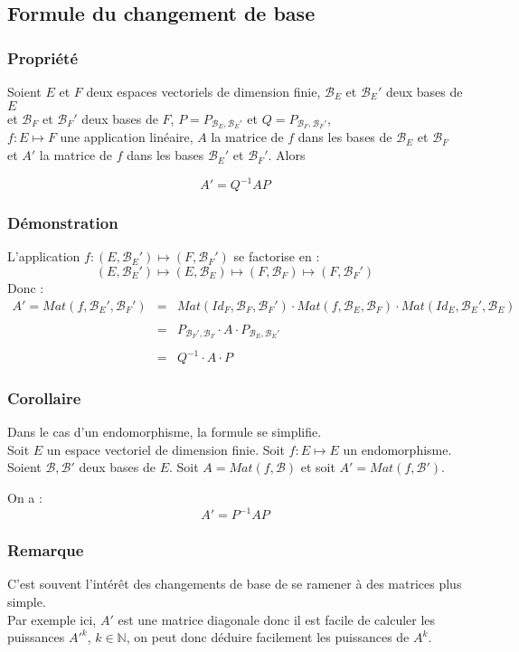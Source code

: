 \documentclass[a4paper,10pt]{book} %
\newcommand{\N}{\mathbb{N}}
\newcommand{\B}{\mathcal{B}}
\begin{document}
\subsection{Formule du changement de base}
\subsubsection{Propriété}
Soient $E$ et $F$ deux espaces vectoriels de dimension finie, $\B_E$ et $\B_E'$ deux bases de $E$\\
et $\B_F$ et $\B_F'$ deux bases de $F$, $P=P_{\B_E,\B_E'}$ et $Q=P_{\B_F,\B_F'}$,\\
$f:E\mapsto F$ une application linéaire, $A$ la matrice de $f$ dans les bases de $\B_E$ et $\B_F$\\
et $A'$ la matrice de $f$ dans les bases $\B_E'$ et $\B_F'$. Alors 

$$A'=Q^{-1}AP$$

\subsubsection{Démonstration}
L'application $f:(E,\B_E')\mapsto (F,\B_F')$ se factorise en :
$$(E,\B_E')\mapsto (E,\B_E)\mapsto (F,\B_F)\mapsto (F,\B_F')$$
Donc :
$$\begin{array}{rcl}A'=Mat(f,\B_E',\B_F')&=& Mat(Id_F,\B_F,\B_F')\cdot Mat(f,\B_E,\B_F)\cdot Mat(Id_E,\B_E',\B_E) \\\\
&=& P_{\B_F',\B_F}\cdot A\cdot P_{\B_E,\B_E'} \\\\
&=& Q^{-1}\cdot A\cdot P \end{array}$$

\subsubsection{Corollaire}
Dans le cas d'un endomorphisme, la formule se simplifie.\\
Soit $E$ un espace vectoriel de dimension finie. Soit $f:E\mapsto E$ un endomorphisme.\\
Soient $\B,\B'$ deux bases de $E$. Soit $A=Mat(f,\B)$ et soit $A'=Mat(f,\B')$.

On 	a :
$$A'=P^{-1}AP$$

\subsubsection{Remarque}
C'est souvent l'intérêt des changements de base de se ramener à des matrices plus simple.\\
Par exemple ici, $A'$ est une matrice diagonale donc il est facile de calculer les puissances $A'^k$, $k\in \N$, on peut donc déduire facilement les puissances de $A^k$.
\end{document}
